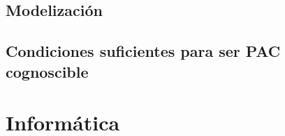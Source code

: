 \documentclass[a4paper,11pt]{report}
\begin{document}
  \chapter{Modelización}
    
    
  \chapter{Condiciones suficientes para ser PAC cognoscible}
    
  
\part{Informática}



\end{document}

